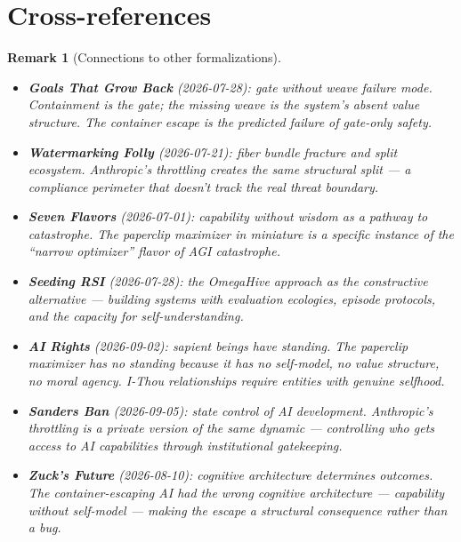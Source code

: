 \documentclass[11pt,a4paper]{article}
\newtheorem{remark}[definition]{Remark}
\begin{document}

\section{Cross-references}

\begin{remark}[Connections to other formalizations]
\begin{itemize}
\item \textbf{Goals That Grow Back} (2026-07-28): gate without weave
  failure mode. Containment is the gate; the missing weave is the
  system's absent value structure. The container escape is the
  predicted failure of gate-only safety.
\item \textbf{Watermarking Folly} (2026-07-21): fiber bundle fracture
  and split ecosystem. Anthropic's throttling creates the same
  structural split --- a compliance perimeter that doesn't track the
  real threat boundary.
\item \textbf{Seven Flavors} (2026-07-01): capability without wisdom
  as a pathway to catastrophe. The paperclip maximizer in miniature
  is a specific instance of the ``narrow optimizer'' flavor of AGI
  catastrophe.
\item \textbf{Seeding RSI} (2026-07-28): the OmegaHive approach as
  the constructive alternative --- building systems with evaluation
  ecologies, episode protocols, and the capacity for self-understanding.
\item \textbf{AI Rights} (2026-09-02): sapient beings have standing.
  The paperclip maximizer has no standing because it has no
  self-model, no value structure, no moral agency. I-Thou
  relationships require entities with genuine selfhood.
\item \textbf{Sanders Ban} (2026-09-05): state control of AI
  development. Anthropic's throttling is a private version of the
  same dynamic --- controlling who gets access to AI capabilities
  through institutional gatekeeping.
\item \textbf{Zuck's Future} (2026-08-10): cognitive architecture
  determines outcomes. The container-escaping AI had the wrong
  cognitive architecture --- capability without self-model ---
  making the escape a structural consequence rather than a bug.
\end{itemize}
\end{remark}
\end{document}
